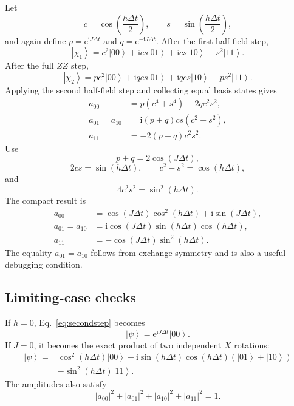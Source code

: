 \documentclass[11pt,a4paper]{article}
\newcommand{\ket}[1]{\left|#1\right\rangle}
\newcommand{\e}{\mathrm{e}}
\newcommand{\ii}{\mathrm{i}}
\begin{document}
Let
\begin{equation}
c=\cos\left(\frac{h\Delta t}{2}\right),\qquad
s=\sin\left(\frac{h\Delta t}{2}\right),
\end{equation}
and again define $p=\e^{\ii J\Delta t}$ and $q=\e^{-\ii J\Delta t}$. After the first half-field step,
\begin{equation}
\ket{\chi_1}=c^2\ket{00}+\ii cs\ket{01}+\ii cs\ket{10}-s^2\ket{11}.
\end{equation}
After the full $ZZ$ step,
\begin{equation}
\ket{\chi_2}=pc^2\ket{00}+\ii qcs\ket{01}+\ii qcs\ket{10}-ps^2\ket{11}.
\end{equation}
Applying the second half-field step and collecting equal basis states gives
\begin{align}
a_{00}&=p(c^4+s^4)-2qc^2s^2,\\
a_{01}=a_{10}&=\ii(p+q)cs(c^2-s^2),\\
a_{11}&=-2(p+q)c^2s^2.
\end{align}
Use
\begin{equation}
p+q=2\cos(J\Delta t),
\end{equation}
\begin{equation}
2cs=\sin(h\Delta t),\qquad c^2-s^2=\cos(h\Delta t),
\end{equation}
and
\begin{equation}
4c^2s^2=\sin^2(h\Delta t).
\end{equation}
The compact result is
\begin{equation}
\boxed{
\begin{aligned}
a_{00}&=\cos(J\Delta t)\cos^2(h\Delta t)+\ii\sin(J\Delta t),\\
a_{01}=a_{10}&=\ii\cos(J\Delta t)\sin(h\Delta t)\cos(h\Delta t),\\
a_{11}&=-\cos(J\Delta t)\sin^2(h\Delta t).
\end{aligned}}
\label{eq:secondstep}
\end{equation}
The equality $a_{01}=a_{10}$ follows from exchange symmetry and is also a useful debugging condition.

\subsection{Limiting-case checks}

If $h=0$, Eq.~\eqref{eq:secondstep} becomes
\begin{equation}
\ket{\psi}=\e^{\ii J\Delta t}\ket{00}.
\end{equation}
If $J=0$, it becomes the exact product of two independent $X$ rotations:
\begin{align}
\ket{\psi}={}&\cos^2(h\Delta t)\ket{00}
+\ii\sin(h\Delta t)\cos(h\Delta t)(\ket{01}+\ket{10})\\
&-\sin^2(h\Delta t)\ket{11}.
\end{align}
The amplitudes also satisfy
\begin{equation}
|a_{00}|^2+|a_{01}|^2+|a_{10}|^2+|a_{11}|^2=1.
\end{equation}
\end{document}
